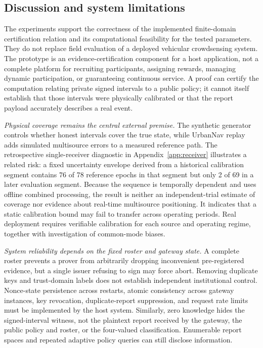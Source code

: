 \subsection{Discussion and system limitations}
The experiments support the correctness of the implemented finite-domain certification relation and its computational feasibility for the tested parameters. They do not replace field evaluation of a deployed vehicular crowdsensing system. The prototype is an evidence-certification component for a host application, not a complete platform for recruiting participants, assigning rewards, managing dynamic participation, or guaranteeing continuous service. A proof can certify the computation relating private signed intervals to a public policy; it cannot itself establish that those intervals were physically calibrated or that the report payload accurately describes a real event.

\emph{Physical coverage remains the central external premise.} The synthetic generator controls whether honest intervals cover the true state, while UrbanNav replay adds simulated multisource errors to a measured reference path. The retrospective single-receiver diagnostic in Appendix~\ref{app:receiver} illustrates a related risk: a fixed uncertainty envelope derived from a historical calibration segment contains 76 of 78 reference epochs in that segment but only 2 of 69 in a later evaluation segment. Because the sequence is temporally dependent and uses offline combined processing, the result is neither an independent-trial estimate of coverage nor evidence about real-time multisource positioning. It indicates that a static calibration bound may fail to transfer across operating periods. Real deployment requires verifiable calibration for each source and operating regime, together with investigation of common-mode biases.

\emph{System reliability depends on the fixed roster and gateway state.} A complete roster prevents a prover from arbitrarily dropping inconvenient pre-registered evidence, but a single issuer refusing to sign may force abort. Removing duplicate keys and trust-domain labels does not establish independent institutional control. Nonce-state persistence across restarts, atomic consistency across gateway instances, key revocation, duplicate-report suppression, and request rate limits must be implemented by the host system. Similarly, zero knowledge hides the signed-interval witness, not the plaintext report received by the gateway, the public policy and roster, or the four-valued classification. Enumerable report spaces and repeated adaptive policy queries can still disclose information.

